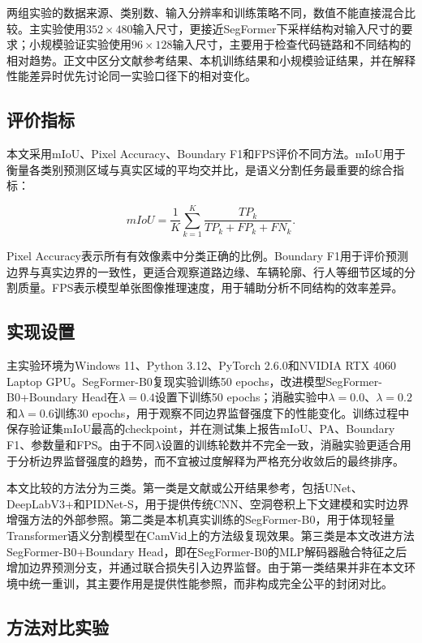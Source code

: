 \documentclass{report}
\begin{document}
两组实验的数据来源、类别数、输入分辨率和训练策略不同，数值不能直接混合比较。主实验使用$352 \times 480$输入尺寸，更接近SegFormer下采样结构对输入尺寸的要求；小规模验证实验使用$96 \times 128$输入尺寸，主要用于检查代码链路和不同结构的相对趋势。正文中区分文献参考结果、本机训练结果和小规模验证结果，并在解释性能差异时优先讨论同一实验口径下的相对变化。

\subsection{评价指标}

本文采用mIoU、Pixel Accuracy、Boundary F1和FPS评价不同方法。mIoU用于衡量各类别预测区域与真实区域的平均交并比，是语义分割任务最重要的综合指标：

\begin{equation}
    mIoU = \frac{1}{K}\sum_{k=1}^{K}\frac{TP_k}{TP_k + FP_k + FN_k}.
\end{equation}

Pixel Accuracy表示所有有效像素中分类正确的比例。Boundary F1用于评价预测边界与真实边界的一致性，更适合观察道路边缘、车辆轮廓、行人等细节区域的分割质量。FPS表示模型单张图像推理速度，用于辅助分析不同结构的效率差异。

\subsection{实现设置}

主实验环境为Windows 11、Python 3.12、PyTorch 2.6.0和NVIDIA RTX 4060 Laptop GPU。SegFormer-B0复现实验训练50 epochs，改进模型SegFormer-B0+Boundary Head在$\lambda=0.4$设置下训练50 epochs；消融实验中$\lambda=0.0$、$\lambda=0.2$和$\lambda=0.6$训练30 epochs，用于观察不同边界监督强度下的性能变化。训练过程中保存验证集mIoU最高的checkpoint，并在测试集上报告mIoU、PA、Boundary F1、参数量和FPS。由于不同$\lambda$设置的训练轮数并不完全一致，消融实验更适合用于分析边界监督强度的趋势，而不宜被过度解释为严格充分收敛后的最终排序。

本文比较的方法分为三类。第一类是文献或公开结果参考，包括UNet、DeepLabV3+和PIDNet-S，用于提供传统CNN、空洞卷积上下文建模和实时边界增强方法的外部参照。第二类是本机真实训练的SegFormer-B0，用于体现轻量Transformer语义分割模型在CamVid上的方法级复现效果。第三类是本文改进方法SegFormer-B0+Boundary Head，即在SegFormer-B0的MLP解码器融合特征之后增加边界预测分支，并通过联合损失引入边界监督。由于第一类结果并非在本文环境中统一重训，其主要作用是提供性能参照，而非构成完全公平的封闭对比。

\subsection{方法对比实验}
\end{document}
